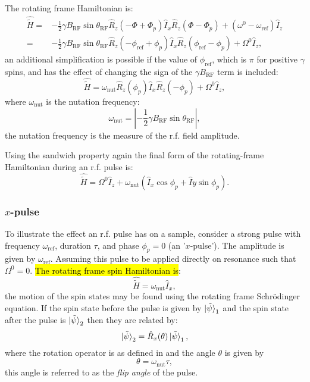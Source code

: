 The rotating frame Hamiltonian is:
\begin{align}
  \hat{\tilde{H}} =& -\frac{1}{2}\gamma{B_{\text{RF}}}\sin{\theta_{\text{RF}}}\hat{R}_z(-\Phi  +  \Phi_p)\hat{I}_x\hat{R}_z(\Phi-\Phi_p) + (\omega^0 - \omega_\text{ref})\hat{I}_z \\
  =& -\frac{1}{2}\gamma{B_{\text{RF}}}\sin{\theta_{\text{RF}}}\hat{R}_z(-\phi_{\text{ref}}  +  \phi_p)\hat{I}_x\hat{R}_z(\phi_{\text{ref}}-\phi_p) + \Omega^0\hat{I}_z,
\end{align}
an additional simplification is possible if the value of $\phi_{\text{ref}}$, which is
$\pi$ for positive $\gamma$ spins, and has the effect of changing the sign of the $\gamma{B_{\text{RF}}}$
term is included:
\begin{equation}
  \hat{\tilde{H}} = \omega_{\text{nut}}\hat{R}_z(\phi_p)\hat{I}_x\hat{R}_z(-\phi_p) + \Omega^0\hat{I}_z,
\end{equation}
where $\omega_{\text{nut}}$ is the nutation frequency:
\begin{equation}
  \omega_{\text{nut}} = |-\frac{1}{2}\gamma{B_{\text{RF}}}\sin{\theta_{\text{RF}}}|,
\end{equation}
the nutation frequency is the measure of the r.f. field amplitude.

Using the sandwich property again the final form of the rotating-frame Hamiltonian during an r.f. pulse
is:
\begin{equation}
  \hat{\tilde{H}} = \Omega^0\hat{I}_z + \omega_{\text{nut}}(\hat{I}_x\cos\phi_p + \hat{I}y\sin\phi_p).
\end{equation}


\subsubsection{$x$-pulse}

To illustrate the effect an r.f. pulse has on a sample, consider a strong
pulse with frequency $\omega_\text{ref}$, duration $\tau$, and phase $\phi_p = 0$ (an '$x$-pulse').
The amplitude is given by $\omega_\text{ref}$. Assuming this pulse to be applied
directly on resonance such that $\Omega^0 = 0$.
\hl{The rotating frame spin Hamiltonian is}:
\begin{equation}
  \hat{\tilde{H}} = \omega_{\text{nut}}\hat{I}_x,
\end{equation}
the motion of the spin states may be found using the rotating frame Schr\"odinger equation. If the
spin state before the pulse is given by $\ket{\tilde{\psi}}_1$ and the spin state after the pulse
is $\ket{\tilde{\psi}}_2$ then they are related by:
\begin{equation}
  \ket{\tilde{\psi}}_2 = \hat{R}_x(\theta)\ket{\tilde{\psi}}_1,
\end{equation}
where the rotation operator is as defined in  and the angle
$\theta$ is given by
\begin{equation}
  \theta = \omega_\text{nut}\tau,
\end{equation}
this angle is referred to as the \textit{flip angle} of the pulse.

